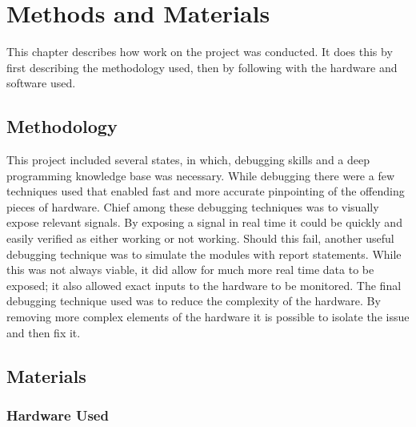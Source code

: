 
\chapter{Methods and Materials} %

\label{Chapter 3} %

This chapter describes how work on the project was conducted. It does this by first describing the methodology used, then by following with the hardware and software used.


\section{Methodology}

\label{Ch3 Sec1}

This project included several states, in which, debugging skills and a deep programming knowledge base was necessary. While debugging there were a few techniques used that enabled fast and more accurate pinpointing of the offending pieces of hardware. Chief among these debugging techniques was to visually expose relevant signals. By exposing a signal in real time it could be quickly and easily verified as either working or not working. Should this fail, another useful debugging technique was to simulate the modules with report statements. While this was not always viable, it did allow for much more real time data to be exposed; it also allowed exact inputs to the hardware to be monitored. The final debugging technique used was to reduce the complexity of the hardware. By removing more complex elements of the hardware it is possible to isolate the issue and then fix it.

\section{Materials}

\label{Ch3 Sec2}

\subsection{Hardware Used}

